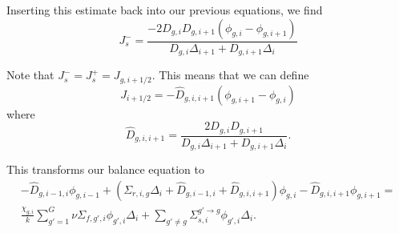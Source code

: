 \documentclass[12pt]{report}
\begin{document}
	Inserting this estimate back into our previous equations, we find
	\begin{equation}
	J_s^- = \frac{-2 D_{g,i} D_{g,i+1} (\phi_{g,i} - \phi_{g,i+1})}{D_{g,i} \Delta_{i+1} + D_{g,i+1} \Delta_i}
	\end{equation}
	
	Note that $J_s^- = J_s^+ = J_{g,i+1/2}$. This means that we can define
	\begin{equation}
	J_{i+1/2} = -\hat{D}_{g,i,i+1} (\phi_{g,i+1} - \phi_{g,i})
	\end{equation}
	where
	\begin{equation}
	\hat{D}_{g,i,i+1} = \frac{2 D_{g,i} D_{g,i+1}}{D_{g,i} \Delta_{i+1} + D_{g,i+1} \Delta_i}.
	\end{equation}
	
	This transforms our balance equation to
	\begin{align}
	-\hat{D}_{g,i-1,i} \phi_{g,i-1} + \left( \Sigma_{r,i,g} \Delta_i + \hat{D}_{g,i-1,i} + \hat{D}_{g,i,i+1} \right) \phi_{g,i} - \hat{D}_{g,i,i+1} \phi_{g,i+1} = \nonumber\\
	\frac{\chi_{g,i}}{k} \sum_{g'=1}^{G} \nu \Sigma_{f,g',i} \phi_{g',i} \Delta_i + \sum_{g'\neq g} \Sigma_{s,i}^{g' \rightarrow g} \phi_{g',i} \Delta_i.
	\end{align}
	
\end{document}
